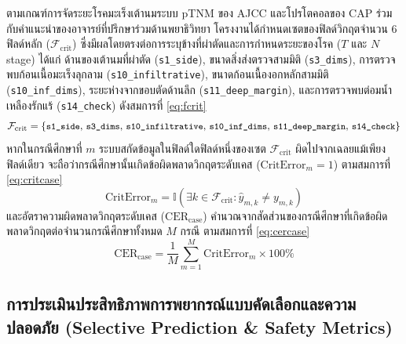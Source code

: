 ตามเกณฑ์การจัดระยะโรคมะเร็งเต้านมระบบ pTNM ของ AJCC และโปรโตคอลของ CAP \cite{cap_breast,ajcc2017} ร่วมกับคำแนะนำของอาจารย์ที่ปรึกษาร่วมด้านพยาธิวิทยา โครงงานได้กำหนดเซตของฟิลด์วิกฤตจำนวน 6 ฟิลด์หลัก ($\mathcal{F}_{\mathrm{crit}}$) ซึ่งมีผลโดยตรงต่อการระบุข้างที่ผ่าตัดและการกำหนดระยะของโรค ($T$ และ $N$ stage) ได้แก่ ด้านของเต้านมที่ผ่าตัด (\texttt{s1\_side}), ขนาดสิ่งส่งตรวจสามมิติ (\texttt{s3\_dims}), การตรวจพบก้อนเนื้อมะเร็งลุกลาม (\texttt{s10\_infiltrative}), ขนาดก้อนเนื้องอกหลักสามมิติ (\texttt{s10\_inf\_dims}), ระยะห่างจากขอบตัดด้านลึก (\texttt{s11\_deep\_margin}), และการตรวจพบต่อมน้ำเหลืองรักแร้ (\texttt{s14\_check}) ดังสมการที่ \eqref{eq:fcrit}
\begin{equation}
{\small \mathcal{F}_{\mathrm{crit}} = \{\texttt{s1\_side},\, \texttt{s3\_dims},\, \texttt{s10\_infiltrative},\, \texttt{s10\_inf\_dims},\, \texttt{s11\_deep\_margin},\,
\texttt{s14\_check}\}}
\label{eq:fcrit}
\end{equation}
หากในกรณีศึกษาที่ $m$ ระบบสกัดข้อมูลในฟิลด์ใดฟิลด์หนึ่งของเซต $\mathcal{F}_{\mathrm{crit}}$ ผิดไปจากเฉลยแม้เพียงฟิลด์เดียว จะถือว่ากรณีศึกษานั้นเกิดข้อผิดพลาดวิกฤตระดับเคส ($\mathrm{CritError}_m = 1$) ตามสมการที่ \eqref{eq:critcase}
\begin{equation}
\mathrm{CritError}_m = \mathbb{I}\!\left( \exists k \in \mathcal{F}_{\mathrm{crit}} : \hat{y}_{m,k} \ne y_{m,k} \right)
\label{eq:critcase}
\end{equation}
และอัตราความผิดพลาดวิกฤตระดับเคส ($\mathrm{CER}_{\mathrm{case}}$) คำนวณจากสัดส่วนของกรณีศึกษาที่เกิดข้อผิดพลาดวิกฤตต่อจำนวนกรณีศึกษาทั้งหมด $M$ กรณี ตามสมการที่ \eqref{eq:cercase}
\begin{equation}
\mathrm{CER}_{\mathrm{case}} = \frac{1}{M} \sum_{m=1}^{M} \mathrm{CritError}_m \times 100\%
\label{eq:cercase}
\end{equation}

\subsection{การประเมินประสิทธิภาพการพยากรณ์แบบคัดเลือกและความปลอดภัย (Selective Prediction \& Safety Metrics)}

